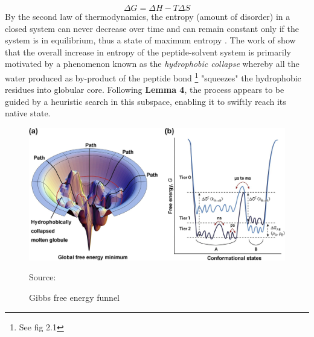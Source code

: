 \[ \Delta G = \Delta H - T \Delta S \]
By the second law of thermodynamics, the entropy (amount of disorder) in a closed system
can never decrease over time and can remain constant only if the
system is in equilibrium, thus a state of maximum entropy \cite{jaffe}.
The work of \cite{Yue,Yang} show that the overall increase in entropy
of the peptide-solvent system is primarily motivated by a phenomenon known as the
\emph{hydrophobic collapse} whereby all the water produced as by-product of the peptide bond
\footnote{See fig 2.1} "squeezes" the hydrophobic residues
into globular core. Following \textbf{Lemma 4}, the process appears
to be guided by a heuristic search in this subspace,
enabling it to swiftly reach its native state.\\

\begin{figure}[!htb]
    \caption{Gibbs free energy funnel}
    \begin{center}
        \includegraphics[trim={0 0 4cm 0.25cm},scale=1.4, clip]{Figures/FreeEnergyLandscape}
    \end{center}
    \scriptsize{\dag Source: \cite{Yang}}
 \end{figure}

